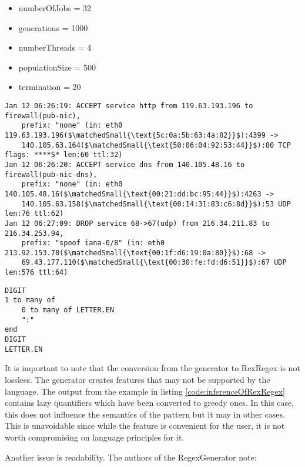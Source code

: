 \begin{itemize}
    \item numberOfJobs = 32
    \item generations = 1000
    \item numberThreads = 4
    \item populationSize = 500
    \item termination = 20
\end{itemize}


\FloatBarrier

\begin{listingBox}[float=htb,title={Infered RexRegex Code from Examples},label=code:inferenceOfRexRegex]
    \begin{lstlisting}[basicstyle=\scriptsize,mathescape=true]
Jan 12 06:26:19: ACCEPT service http from 119.63.193.196 to firewall(pub-nic), 
    prefix: "none" (in: eth0 119.63.193.196($\matchedSmall{\text{5c:0a:5b:63:4a:82}}$):4399 -> 
    140.105.63.164($\matchedSmall{\text{50:06:04:92:53:44}}$):80 TCP flags: ****S* len:60 ttl:32)
Jan 12 06:26:20: ACCEPT service dns from 140.105.48.16 to firewall(pub-nic-dns), 
    prefix: "none" (in: eth0 140.105.48.16($\matchedSmall{\text{00:21:dd:bc:95:44}}$):4263 -> 
    140.105.63.158($\matchedSmall{\text{00:14:31:83:c6:8d}}$):53 UDP len:76 ttl:62)
Jan 12 06:27:09: DROP service 68->67(udp) from 216.34.211.83 to 216.34.253.94, 
    prefix: "spoof iana-0/8" (in: eth0 213.92.153.78($\matchedSmall{\text{00:1f:d6:19:0a:80}}$):68 -> 
    69.43.177.110($\matchedSmall{\text{00:30:fe:fd:d6:51}}$):67 UDP len:576 ttl:64)
    \end{lstlisting}
    \tcblower
    \begin{lstlisting}[style=rexregex]
DIGIT
1 to many of
    0 to many of LETTER.EN
    ":"
end
DIGIT
LETTER.EN
    \end{lstlisting}
\end{listingBox}

It is important to note that the conversion from the generator to RexRegex is not lossless. The generator creates features that may not be supported by the language. The output from the example in listing \ref{code:inferenceOfRexRegex} contains lazy quantifiers which have been converted to greedy ones. In this case, this does not influence the semantics of the pattern but it may in other cases. This is unavoidable since while the feature is convenient for the user, it is not worth compromising on language principles for it.

Another issue is readability. The authors of the RegexGenerator note: 

